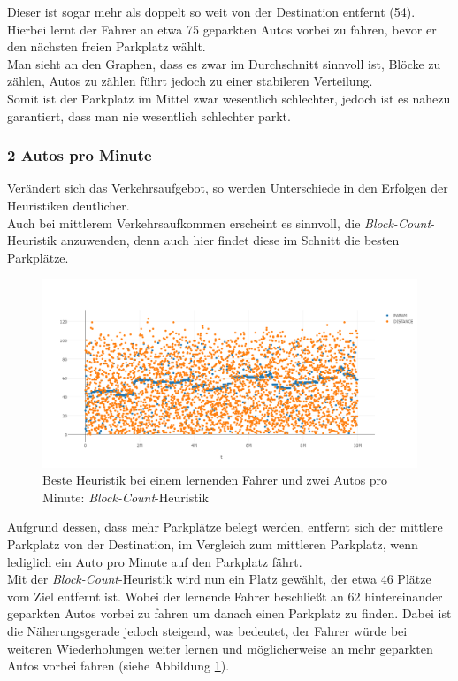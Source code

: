 Dieser ist sogar mehr als doppelt so weit von der Destination entfernt (54).
Hierbei lernt der Fahrer an etwa 75 geparkten Autos vorbei zu fahren, bevor er den nächsten freien Parkplatz wählt.\\
Man sieht an den Graphen, dass es zwar im Durchschnitt sinnvoll ist, Blöcke zu zählen, Autos zu zählen führt jedoch zu einer stabileren Verteilung.\\
Somit ist der Parkplatz im Mittel zwar wesentlich schlechter, jedoch ist es nahezu garantiert, dass man nie wesentlich schlechter parkt.

\subsubsection{2 Autos pro Minute}

Verändert sich das Verkehrsaufgebot, so werden Unterschiede in den Erfolgen der Heuristiken deutlicher.\\
Auch bei mittlerem Verkehrsaufkommen erscheint es sinnvoll, die \emph{Block-Count}-Heuristik anzuwenden, denn auch hier findet diese im Schnitt die besten Parkplätze. 
\begin{figure}
	\includegraphics[width=\textwidth]{analyse/SingleMutant/blockcount2.png}
	\caption{Beste Heuristik bei einem lernenden Fahrer und zwei Autos pro Minute: \emph{Block-Count}-Heuristik}\label{fig:res_sm_2pm_best}
\end{figure}
Aufgrund dessen, dass mehr Parkplätze belegt werden, entfernt sich der mittlere Parkplatz von der Destination, im Vergleich zum mittleren Parkplatz, wenn lediglich ein Auto pro Minute auf den Parkplatz fährt.\\
Mit der \emph{Block-Count}-Heuristik wird nun ein Platz gewählt, der etwa 46 Plätze vom Ziel entfernt ist. Wobei der lernende Fahrer beschließt an 62 hintereinander geparkten Autos vorbei zu fahren um danach einen Parkplatz zu finden. Dabei ist die Näherungsgerade jedoch steigend, was bedeutet, der Fahrer würde bei weiteren Wiederholungen weiter lernen und möglicherweise an mehr geparkten Autos vorbei fahren (siehe Abbildung \ref{fig:res_sm_2pm_best}).\\
